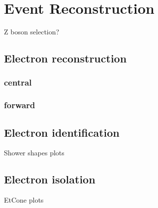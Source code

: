 \chapter{Event Reconstruction}
\label{sec:Reconstruction}

Z boson selection?

\section{Electron reconstruction}
\label{sec:Rec_elec}

\subsection{central}

\subsection{forward}

\section{Electron identification}
\label{sec:Rec_elecID}

Shower shapes plots

\section{Electron isolation}
\label{sec:Rec_eleciso}

EtCone plots
